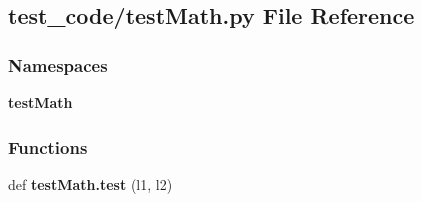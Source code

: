 \subsection{test\+\_\+code/test\+Math.py File Reference}
\label{a00209}
\subsubsection*{Namespaces}
\begin{DoxyCompactItemize}
\item 
 \textbf{ test\+Math}
\end{DoxyCompactItemize}
\subsubsection*{Functions}
\begin{DoxyCompactItemize}
\item 
def \textbf{ test\+Math.\+test} (l1, l2)
\end{DoxyCompactItemize}
